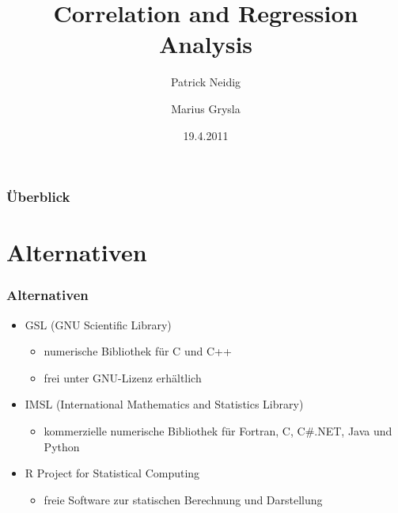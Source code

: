 \documentclass{beamer}
\begin{document}
\title{Correlation and Regression Analysis}
\author{Patrick Neidig \and Marius Grysla}
\date{19.4.2011}
\frame{\titlepage}

\begin{frame}
 \frametitle{\"Uberblick}
 \tableofcontents
\end{frame}

\section{Alternativen}

\begin{frame}
 \frametitle{Alternativen}
 \begin{itemize}
  \item GSL (GNU Scientific Library)
   \begin{itemize}
    \item numerische Bibliothek f\"ur C und  C++
    \item frei unter GNU-Lizenz erh\"altlich
   \end{itemize}
  \item IMSL (International Mathematics and Statistics Library)
   \begin{itemize}
    \item kommerzielle numerische Bibliothek f\"ur Fortran, C, C\#.NET, Java und Python
   \end{itemize}
  \item R Project for Statistical Computing
  \begin{itemize}
    \item freie Software zur statischen Berechnung und Darstellung
   \end{itemize}
 \end{itemize}

\end{frame}
\end{document}
